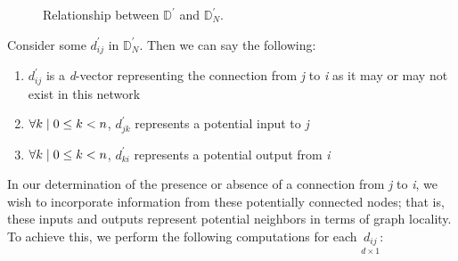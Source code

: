 \begin{figure}[H]
	\centering
	\caption{Relationship between $\mathbb{D}^{\prime}$ and 
		$\mathbb{D}^{\prime}_N$.}
	\label{fig:transform}
\end{figure}\noindent
Consider some $d_{ij}^{\prime}$ in $\mathbb{D}^{\prime}_N$. Then we can say the 
following:
\begin{enumerate}
	\item $d_{ij}^{\prime}$ is  a \textit{d}-vector representing the connection 
		from \textit{j} to \textit{i} as it may or may not exist in this network
	\item $\mathlarger\forall k \mid 0 \leq k < n$, $d_{jk}^{\prime}$ represents 
		a potential input to \textit{j}
	\item $\mathlarger\forall k \mid 0 \leq k < n$, $d_{ki}^{\prime}$ represents 
		a potential output from \textit{i}
\end{enumerate}
In our determination of the presence or absence of a connection from \textit{j} 
to \textit{i}, we wish to incorporate information from these potentially 
connected nodes; that is, these inputs and outputs represent potential neighbors 
in terms of graph locality. To achieve this, we perform the following 
computations for each $\underset{d \times 1}{d_{ij}}$:
